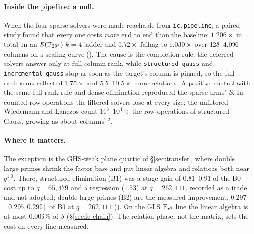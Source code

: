 \paragraph{Inside the pipeline: a null.} When the four sparse solvers were
made reachable from \texttt{ic.pipeline}, a paired study found that every one
costs \emph{more} end to end than the baseline: $1.206\times$ in total on an
$E(\mathbb{F}_{29^4})$ $k=4$ ladder and $5.72\times$ falling to $1.030\times$ over
128--4{,}096 columns on a scaling curve
(). The cause is the
completion rule: the deferred solvers answer only at full column rank, while
\texttt{structured-gauss} and \texttt{incremental-gauss} stop as soon as the
target's column is pinned, so the full-rank arms collected $1.75\times$ and
$5.5$--$10.5\times$ more relations. A positive control with the same
full-rank rule and dense elimination reproduced the sparse arms' $S$. In
counted row operations the filtered solvers lose at every size; the
unfiltered Wiedemann and Lanczos count $10^3$--$10^4\times$ the row operations
of structured Gauss, growing as about columns$^{2.2}$.

\paragraph{Where it matters.} The exception is the GHS-weak plane quartic of
\S\ref{sec:transfer}, where double large primes shrink the factor base and
put linear algebra and relations both near $q^{1.0}$. There, structured
elimination (B1) was a stage gain of $0.81$--$0.91$ of the B0 cost up to
$q=65{,}479$ and a regression ($1.53$) at $q=262{,}111$, recorded as a trade
and not adopted; double large primes (B2) are the measured improvement,
$0.297$ $[0.295,0.299]$ of B0 at $q=262{,}111$
(). On the GLS $\mathbb{F}_{p^4}$
line the linear algebra is at most $0.006\%$ of $S$ (\S\ref{sec:fe-chain}).
The relation phase, not the matrix, sets the cost on every line measured.

